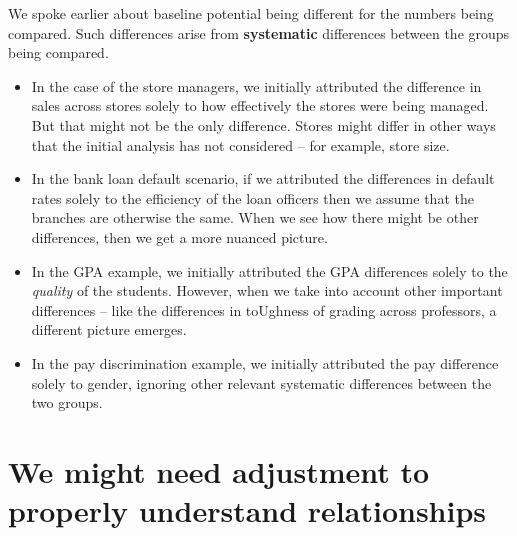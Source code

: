 \documentclass[
  12pt,
  letterpaper,
  DIV=11,
  numbers=noendperiod]{scrreprt}
\begin{document}
\begin{tcolorbox}[enhanced jigsaw, colback=white, leftrule=.75mm, toprule=.15mm, bottomtitle=1mm, breakable, coltitle=black, toptitle=1mm, title=\textcolor{quarto-callout-important-color}{\faExclamation}\hspace{0.5em}{Important}, opacitybacktitle=0.6, colbacktitle=quarto-callout-important-color!10!white, arc=.35mm, left=2mm, colframe=quarto-callout-important-color-frame, titlerule=0mm, rightrule=.15mm, bottomrule=.15mm, opacityback=0]

We spoke earlier about baseline potential being different for the
numbers being compared. Such differences arise from \textbf{systematic}
differences between the groups being compared.

\begin{itemize}
\item
  In the case of the store managers, we initially attributed the
  difference in sales across stores solely to how effectively the stores
  were being managed. But that might not be the only difference. Stores
  might differ in other ways that the initial analysis has not
  considered -- for example, store size.
\item
  In the bank loan default scenario, if we attributed the differences in
  default rates solely to the efficiency of the loan officers then we
  assume that the branches are otherwise the same. When we see how there
  might be other differences, then we get a more nuanced picture.
\item
  In the GPA example, we initially attributed the GPA differences solely
  to the \emph{quality} of the students. However, when we take into
  account other important differences -- like the differences in
  toUghness of grading across professors, a different picture emerges.
\item
  In the pay discrimination example, we initially attributed the pay
  difference solely to gender, ignoring other relevant systematic
  differences between the two groups.
\end{itemize}

\end{tcolorbox}

\section{We might need adjustment to properly understand
relationships}\label{we-might-need-adjustment-to-properly-understand-relationships}
\end{document}
